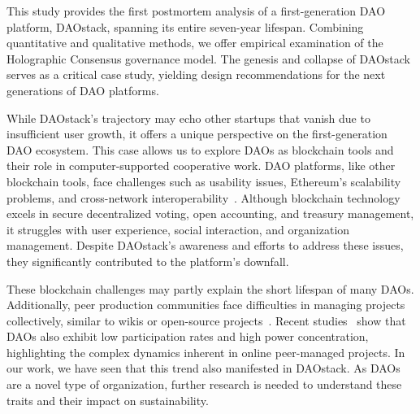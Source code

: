 \documentclass[10pt,lineno]{wlpeerj}
\begin{document}
This study provides the first postmortem analysis of a first-generation DAO platform, DAOstack, spanning its entire seven-year lifespan. Combining quantitative and qualitative methods, we offer empirical examination of the Holographic Consensus governance model. The genesis and collapse of DAOstack serves as a critical case study, yielding design recommendations for the next generations of DAO platforms.

While DAOstack’s trajectory may echo other startups that vanish due to insufficient user growth, it offers a unique perspective on the first-generation DAO ecosystem. This case allows us to explore DAOs as blockchain tools and their role in computer-supported cooperative work. DAO platforms, like other blockchain tools, face challenges such as usability issues, Ethereum’s scalability problems, and cross-network interoperability~\citep{Open_Problems_2023}. Although blockchain technology excels in secure decentralized voting, open accounting, and treasury management, it struggles with user experience, social interaction, and organization management. Despite DAOstack’s awareness and efforts to address these issues, they significantly contributed to the platform’s downfall.




These blockchain challenges may partly explain the short lifespan of many DAOs. Additionally, peer production communities face difficulties in managing projects collectively, similar to wikis or open-source projects~\citep{ortega_inequality_2008, Gasparini_2020, Tenorio2021Participation}. Recent studies~\citep{goldberg_metaverse_2023,pena-calvin_concentration_2024} show that DAOs also exhibit low participation rates and high power concentration, highlighting the complex dynamics inherent in online peer-managed projects. In our work, we have seen that this trend also manifested in DAOstack. As DAOs are a novel type of organization, further research is needed to understand these traits and their impact on sustainability.
\end{document}
